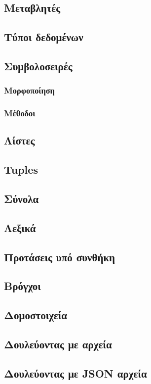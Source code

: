\documentclass[a4paper,10pt]{report}
\begin{document}
\subsection{Μεταβλητές}
\subsection{Τύποι δεδομένων}
\subsection{Συμβολοσειρές}
\subsubsection{Μορφοποίηση}
\subsubsection{Μέθοδοι}
\subsection{Λίστες}
\subsection{Tuples}
\subsection{Σύνολα}
\subsection{Λεξικά}
\subsection{Προτάσεις υπό συνθήκη}
\subsection{Βρόγχοι}
\subsection{Δομοστοιχεία}
\subsection{Δουλεύοντας με αρχεία}
\subsection{Δουλεύοντας με JSON αρχεία}
\end{document}
